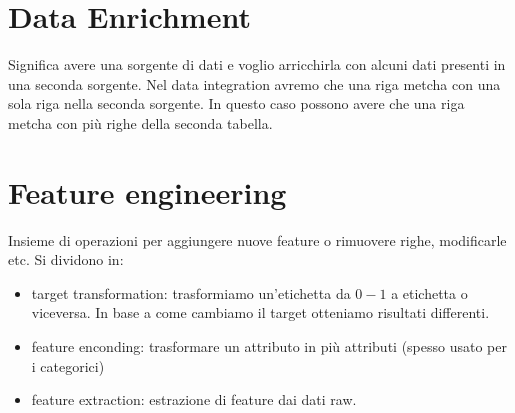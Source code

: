 \section{Data Enrichment}
Significa avere una sorgente di dati e voglio arricchirla con alcuni dati presenti 
in una seconda sorgente. Nel data integration  avremo che una riga metcha con una 
sola riga nella seconda sorgente. In questo caso possono avere che una riga metcha 
con più righe della seconda tabella.

\section{Feature engineering}
Insieme di operazioni per aggiungere nuove feature o rimuovere righe, modificarle 
etc. Si dividono
in:
\begin{itemize}
      \item target transformation: trasformiamo un'etichetta da $0-1$ a etichetta o viceversa.
      In base a come cambiamo il target otteniamo risultati differenti.
      \item feature enconding: trasformare un attributo in più attributi (spesso usato per i categorici)
      \item feature extraction: estrazione di feature dai dati raw.
\end{itemize}